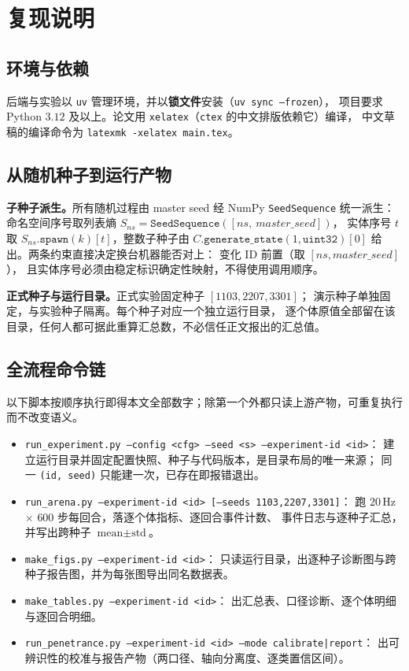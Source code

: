 \section{复现说明}\label{sec:repro}

\subsection{环境与依赖}

后端与实验以 \texttt{uv} 管理环境，并以\textbf{锁文件}安装（\texttt{uv sync --frozen}），
项目要求 Python $3.12$ 及以上。论文用 \texttt{xelatex}（\texttt{ctex} 的中文排版依赖它）编译，
中文草稿的编译命令为 \texttt{latexmk -xelatex main.tex}。

\subsection{从随机种子到运行产物}

\textbf{子种子派生。}所有随机过程由 master seed 经 NumPy \texttt{SeedSequence} 统一派生：
命名空间序号取列表熵 $S_{ns}=\texttt{SeedSequence}([ns,\ master\_seed])$，
实体序号 $t$ 取 $S_{ns}.\texttt{spawn}(k)[t]$，整数子种子由
$C.\texttt{generate\_state}(1,\texttt{uint32})[0]$ 给出。两条约束直接决定换台机器能否对上：
变化 ID 前置（取 $[ns, master\_seed]$），
且实体序号必须由稳定标识确定性映射，不得使用调用顺序。

\textbf{正式种子与运行目录。}正式实验固定种子 $[1103,2207,3301]$；
演示种子单独固定，与实验种子隔离。每个种子对应一个独立运行目录，
逐个体原值全部留在该目录，任何人都可据此重算汇总数，不必信任正文报出的汇总值。

\subsection{全流程命令链}

以下脚本按顺序执行即得本文全部数字；除第一个外都只读上游产物，可重复执行而不改变语义。

\begin{itemize}
  \item \texttt{run\_experiment.py --config <cfg> --seed <s> --experiment-id <id>}：
        建立运行目录并固定配置快照、种子与代码版本，是目录布局的唯一来源；
        同一 \texttt{(id, seed)} 只能建一次，已存在即报错退出。
  \item \texttt{run\_arena.py --experiment-id <id> [--seeds 1103,2207,3301]}：
        跑 $20$\,Hz $\times$ $600$ 步每回合，落逐个体指标、逐回合事件计数、
        事件日志与逐种子汇总，并写出跨种子 $\text{mean}\pm\text{std}$。
  \item \texttt{make\_figs.py --experiment-id <id>}：
        只读运行目录，出逐种子诊断图与跨种子报告图，并为每张图导出同名数据表。
  \item \texttt{make\_tables.py --experiment-id <id>}：
        出汇总表、口径诊断、逐个体明细与逐回合明细。
  \item \texttt{run\_penetrance.py --experiment-id <id> --mode calibrate|report}：
        出可辨识性的校准与报告产物（两口径、轴向分离度、逐类置信区间）。
\end{itemize}

